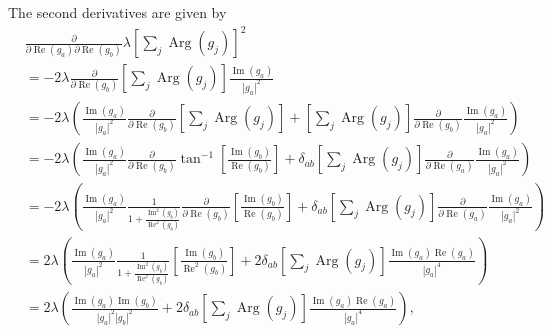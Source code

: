 \documentclass{article}
\newcommand\re{\operatorname{Re}}
\newcommand\im{\operatorname{Im}}
\begin{document}
The second derivatives are given by
\begin{align}
    &\frac{\partial}
    {\partial \re(g_a) \partial \re(g_b)} \lambda \left[ \sum_j \operatorname{Arg}(g_j) \right]^2 \\
    &= -2 \lambda \frac{\partial}{\partial \re(g_b)} \left[ \sum_j \operatorname{Arg}(g_j) \right] \frac{\im(g_a)}{|g_a|^2} \\
    &= -2 \lambda \left( \frac{\im(g_a)}{|g_a|^2} \frac{\partial}{\partial \re(g_b)} \left[ \sum_j \operatorname{Arg}(g_j) \right] + \left[ \sum_j \operatorname{Arg}(g_j) \right] \frac{\partial}{\partial \re(g_b)} \frac{\im(g_a)}{|g_a|^2}  \right) \\
    &= -2 \lambda \left( \frac{\im(g_a)}{|g_a|^2} \frac{\partial}{\partial \re(g_b)} \tan^{-1} \left[ \frac{\im(g_b)}{\re(g_b)} \right] + \delta_{ab} \left[ \sum_j \operatorname{Arg}(g_j) \right] \frac{\partial}{\partial \re(g_a)} \frac{\im(g_a)}{|g_a|^2}  \right) \\
    &= -2 \lambda \left( \frac{\im(g_a)}{|g_a|^2} \frac{1}{1+\frac{\im^2(g_b)}{\re^2(g_b)}} \frac{\partial}
    {\partial \re(g_b)} \left[ \frac{\im(g_b)}{\re(g_b)} \right] + \delta_{ab} \left[ \sum_j \operatorname{Arg}(g_j) \right] \frac{\partial}{\partial \re(g_a)} \frac{\im(g_a)}{|g_a|^2}  \right) \\
    &= 2 \lambda \left( \frac{\im(g_a)}{|g_a|^2} \frac{1}{1+\frac{\im^2(g_b)}{\re^2(g_b)}} \left[ \frac{\im(g_b)}{\re^2(g_b)} \right] + 2 \delta_{ab} \left[ \sum_j \operatorname{Arg}(g_j) \right] \frac{\im(g_a) \re(g_a)}{|g_a|^4}  \right) \\
    &= 2 \lambda \left( \frac{\im(g_a) \im(g_b)}{|g_a|^2 |g_b|^2} + 2 \delta_{ab} \left[ \sum_j \operatorname{Arg}(g_j) \right] \frac{\im(g_a) \re(g_a)}{|g_a|^4}  \right), \\
\end{align}
\end{document}
